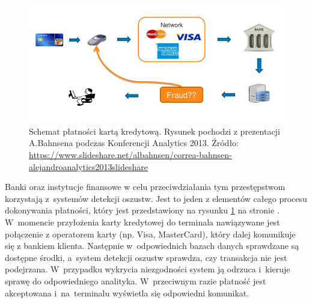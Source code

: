 \documentclass[inzynierska]{pwr_wmat_praca_dyplomowa}
\theoremstyle{plain}
\numberwithin{theorem}{chapter}
\theoremstyle{definition}
\numberwithin{theorem}{chapter}
\begin{document}
\begin{figure}[h]
	\includegraphics[width=\linewidth]{images/credit-card-flow.jpg}
	\caption{Schemat płatności kartą kredytową. Rysunek pochodzi z prezentacji A.Bahnsena podczas Konferencji Analytics 2013. Źródło: \url{https://www.slideshare.net/albahnsen/correa-bahnsen-alejandroanalytics2013slideshare}}
	\label{fig:credit-card-flow}
\end{figure}

Banki oraz instytucje finansowe w celu przeciwdziałania tym przestępstwom korzystają z~systemów detekcji oszustw. Jest to jeden z elementów całego procesu dokonywania płatności, który jest przedstawiony na rysunku \ref{fig:credit-card-flow} na stronie \pageref{fig:credit-card-flow}. W~momencie przyłożenia karty kredytowej do terminala nawiązywane jest połączenie z operatorem karty (np. Visa, MasterCard), który dalej komunikuje się z bankiem klienta. Następnie w~odpowiednich bazach danych sprawdzane są dostępne środki, a~system detekcji oszustw sprawdza, czy transakcja nie jest podejrzana. W~przypadku wykrycia niezgodności system ją odrzuca i~kieruje sprawę do odpowiedniego analityka. W~przeciwnym razie płatność jest akceptowana i~na~terminalu wyświetla się odpowiedni komunikat.
\end{document}
